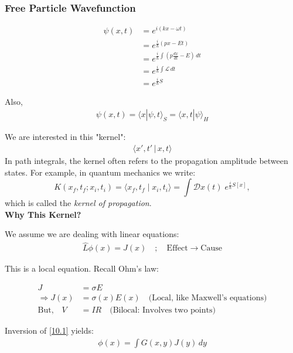 \documentclass[14pt]{article} %
\begin{document}
\subsubsection*{Free Particle Wavefunction}

\begin{align*}
\psi(x,t) &= e^{i(kx - \omega t)} \\
          &= e^{\frac{i}{\hbar}(px - Et)} \\
          &= e^{\frac{i}{\hbar} \int (p \frac{dx}{dt} - E) \, dt} \\
          &= e^{\frac{i}{\hbar} \int \mathcal{L} \, dt} \\
          &= e^{\frac{i}{\hbar} S}
\end{align*}

Also,
\begin{align*}
\psi(x,t) =\langle x | \psi, t \rangle_{S} = \langle x, t | \psi \rangle_{H}
\end{align*}

We are interested in this "kernel":
\begin{align*}
\langle{x',t' \,|\, x,t}\rangle
\end{align*}
In path integrals, the kernel often refers to the propagation amplitude between states.
For example, in quantum mechanics we write:
\[
K(x_f, t_f; x_i, t_i) 
= \langle x_f, t_f \mid x_i, t_i \rangle
= \int \mathcal{D}x(t)\; e^{\tfrac{i}{\hbar} S[x]} ,
\]
which is called the \emph{kernel of propagation}.\\

\textbf{Why This Kernel?}

We assume we are dealing with linear equations:
\begin{align*}
\hat{L} \phi(x) = J(x)  \quad ; \quad \text{Effect} \rightarrow \text{Cause} \tag{10.1} \label{10.1}
\end{align*}

This is a local equation.
Recall Ohm's law:

\begin{align*}
J &= \sigma E \\
\Rightarrow J(x) &= \sigma(x) E(x) \quad \text{(Local, like Maxwell's equations)} \\
\text{But,} \quad V &= IR \quad \text{(Bilocal: Involves two points)}
\end{align*}

Inversion of \eqref{10.1} yields:
\begin{align*}
\phi(x) = \int G(x, y) J(y) \, dy
\end{align*}
\end{document}
